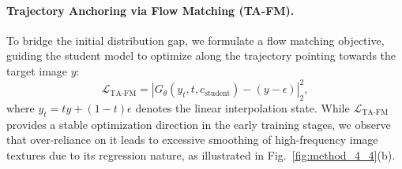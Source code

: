 \paragraph{Trajectory Anchoring via Flow Matching (TA-FM).}
To bridge the initial distribution gap, we formulate a flow matching objective, guiding the student model to optimize along the trajectory pointing towards the target image $y$:
\begin{equation}
\mathcal{L}_{\text{TA-FM}} = \left| G_{\theta}(y_{t}, t, c_{\text{student}}) - (y - \epsilon) \right|_2^2,
\end{equation}
where $y_{t}=ty+(1-t)\epsilon$ denotes the linear interpolation state.
While $\mathcal{L}_{\text{TA-FM}}$ provides a stable optimization direction in the early training stages, we observe that over-reliance on it leads to excessive smoothing of high-frequency image textures due to its regression nature, as illustrated in Fig.~\ref{fig:method_4_4}(b).
